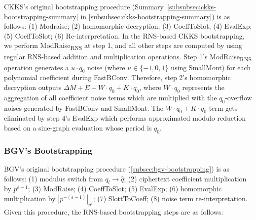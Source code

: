CKKS's original bootstrapping procedure (Summary~\ref*{subsubsec:ckks-bootstrapping-summary} in \autoref{subsubsec:ckks-bootstrapping-summary}) is as follows:
(1) \textsf{Modraise}; (2) homomorphic decryption; (3) \textsf{CoeffToSlot}; (4) \textsf{EvalExp}; (5) \textsf{CoeffToSlot}; (6) Re-interpretation. In the RNS-based CKKS bootstrapping, we perform \textsf{ModRaise\textsubscript{RNS}} at step 1, and all other steps are computed by using regular RNS-based addition and multiplication operations. Step 1's \textsf{ModRaise\textsubscript{RNS}} operation generates a 
$u\cdot q_0$ noise (where $u \in \{-1, 0, 1\}$ using \textsf{SmallMont}) for each polynomial coefficient during \textsf{FastBConv}. Therefore, step 2's homomorphic decryption outputs $\Delta M + E + W\cdot q_0 + K\cdot q_0$, where $W\cdot q_0$ represents the aggregation of all coefficient noise terms which are multiplied with the $q_0$-overflow noises generated by \textsf{FastBConv} and \textsf{SmallMont}. The $W\cdot q_0 + K\cdot q_0$ term gets eliminated by step 4's \textsf{EvalExp} which performs approximated modulo reduction based on a sine-graph evaluation whose period is $q_0$. 




\subsubsection{BGV's Bootstrapping}
\label{subsubsec:rns-bgv-bootstrapping}

BGV's original bootstrapping procedure (\autoref{subsec:bgv-bootstrapping}) is as follows:
(1) modulus switch from $q_l \rightarrow \hat{q}$; (2) ciphertext coefficient multiplication by $p^{\varepsilon - 1}$; (3) \textsf{ModRaise}; (4) \textsf{CoeffToSlot}; (5) \textsf{EvalExp}; (6) homomorphic multiplication by $|p^{-(\varepsilon-1)}|_{p^\varepsilon}$; (7) \textsf{SlottToCoeff}; (8) noise term re-interpretation. Given this procedure, the RNS-based bootstrapping steps are as follows:

